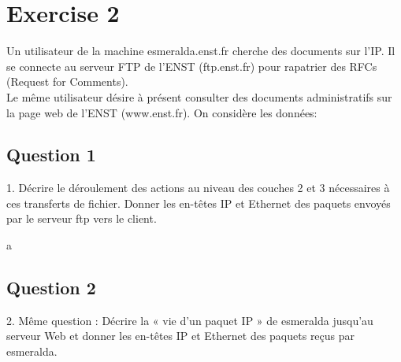 \documentclass{article}
\begin{document}
\section*{Exercise 2}
Un utilisateur de la machine esmeralda.enst.fr cherche des documents sur l'IP. Il se connecte au serveur FTP de l'ENST (ftp.enst.fr) pour rapatrier des RFCs (Request for Comments).\\

Le même utilisateur désire à présent consulter des documents administratifs sur la page web de l'ENST (www.enst.fr). On considère les données:




\subsection*{Question 1}
\begin{exercise}
    1. Décrire le déroulement des actions au niveau des couches 2 et 3 nécessaires à ces transferts de fichier. Donner les en-têtes IP et Ethernet des paquets envoyés par le serveur ftp vers le client.
\end{exercise}
\begin{resolution}
    a
\end{resolution}

\subsection*{Question 2}
\begin{exercise}
    2. Même question : Décrire la « vie d'un paquet IP » de esmeralda jusqu'au serveur Web et donner les en-têtes IP et Ethernet des paquets reçus par esmeralda.
\end{exercise}
\begin{resolution}

\end{resolution}
\end{document}
